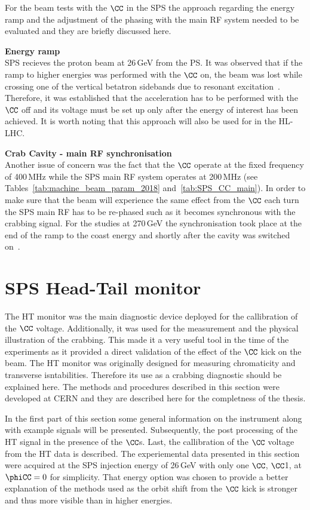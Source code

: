For the beam tests with the $\CC$ in the SPS the approach regarding the energy ramp and the adjustment of the phasing with the main RF system needed to be evaluated and they are briefly discussed here.


\normalsize{\textbf{Energy ramp}}\\
SPS recieves the proton beam at 26\,GeV from the PS. It was observed that if the ramp to higher energies was performed with the $\CC$ on, the beam was lost while crossing one of the vertical betatron sidebands due to resonant excitation~\cite{Rama_Paris_persentation}. Therefore, it was established that the acceleration has to be performed with the $\CC$ off and its voltage must be set up only after the energy of interest has been achieved. It is worth noting that this approach will also be used for in the HL-LHC.

\normalsize{\textbf{Crab Cavity - main RF synchronisation}}\\
Another issue of concern was the fact that the $\CC$ operate at the fixed frequency of 400\,MHz while the SPS main RF system operates at 200\,MHz (see Tables~\ref{tab:machine_beam_param_2018} and~\ref{tab:SPS_CC_main}).
In order to make sure that the beam will experience the same effect from the $\CC$ each turn the SPS main RF has to be re-phased such as it becomes synchronous with the crabbing signal. For the studies at 270\,GeV the synchronisation took place at the end of the ramp to the coast energy and shortly after the cavity was switched on~\cite{BE_seminar}.


\section{SPS Head-Tail monitor}\label{sec:HT_info}
The HT monitor was the main diagnostic device deployed for the callibration of the $\CC$ voltage. Additionally, it was used for the measurement and the physical illustration of the crabbing. This made it a very useful tool in the time of the experiments as it provided a direct validation of the effect of the $\CC$ kick on the beam. The HT monitor was originally designed for measuring chromaticity and transverse isntabilities. Therefore its use as a crabbing diagnostic should be explained here. The methods and procedures described in this section were developed at CERN and they are described here for the completness of the thesis.

 In the first part of this section some general information on the instrument along with example signals will be presented. Subsequently, the post processing of the HT signal in the presence of the $\CC$s. Last, the callibration of the $\CC$ voltage from the HT data is described. The experiemental data presented in this section were acquired at the SPS injection energy of 26\,GeV with only one $\CC$, $\CC$1, at $\phiCC=0$ for simplicity. That energy option was chosen to provide a better explanation of the methods used as the orbit shift from the $\CC$ kick is stronger and thus more visible than in higher energies.



